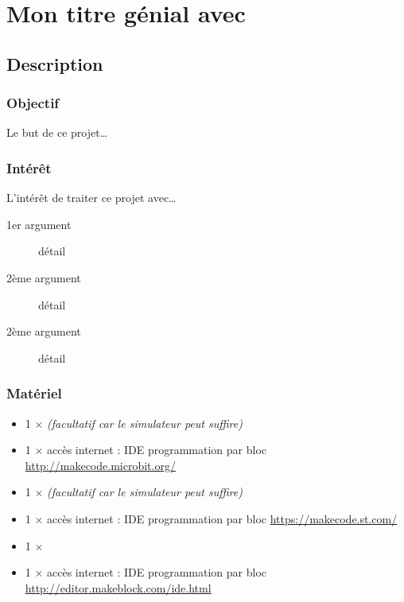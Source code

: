 \section{Mon titre génial avec \mb}


%
\pagestyle{mb} %

\subsection{Description}

\subsubsection{Objectif}


\begin{formule}
Le but de ce projet\ldots
\end{formule}


\subsubsection{Intérêt}

L'intérêt de traiter ce projet avec\ldots

\begin{description}
    \item [1er argument] détail
    \item [2ème argument] détail
    \item [2ème argument] détail
\end{description}


\subsubsection{Matériel}
\begin{itemize}
    \item 1 $\times$ \matosMb \emph{(facultatif car le simulateur peut suffire)}
    \item 1 $\times$ accès internet : IDE programmation par bloc \url{http://makecode.microbit.org/}
    \item 1 $\times$ \matosSt \emph{(facultatif car le simulateur peut suffire)}
   \item 1 $\times$ accès internet : IDE programmation par bloc \url{https://makecode.st.com/}
    \item 1 $\times$ \matosMbot
   \item 1 $\times$ accès internet : IDE programmation par bloc \url{http://editor.makeblock.com/ide.html}
\end{itemize}



